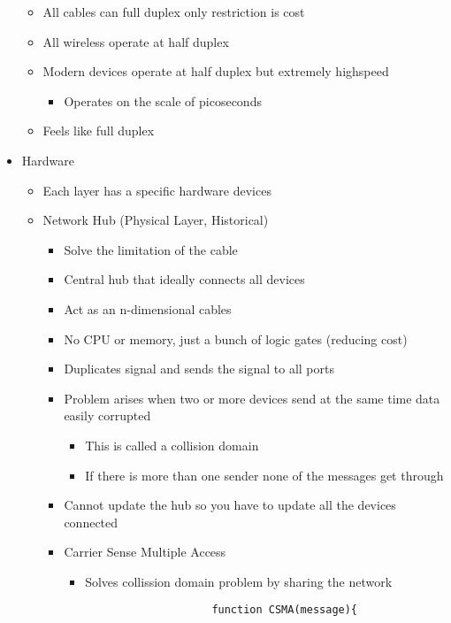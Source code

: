 \documentclass{article}
\begin{document}
\begin{itemize}
\begin{itemize}
\begin{itemize}
        \end{itemize}
        \item All cables can full duplex only restriction is cost
        \item All wireless operate at half duplex
        \item Modern devices operate at half duplex but extremely highspeed
        \begin{itemize}
            \item Operates on the scale of picoseconds
        \end{itemize}
        \item Feels like full duplex 
    \end{itemize}
    \item Hardware
    \begin{itemize}
        \item Each layer has a specific hardware devices
        \item Network Hub (Physical Layer, Historical)
        \begin{itemize}
            \item Solve the limitation of the cable
            \item Central hub that ideally connects all devices
            \item Act as an n-dimensional cables
            \item No CPU or memory, just a bunch of logic gates (reducing cost)
            \item Duplicates signal and sends the signal to all ports
            \item Problem arises when two or more devices send at the same time data easily corrupted
            \begin{itemize}
                \item This is called a collision domain
                \item If there is more than one sender none of the messages get through
            \end{itemize}
            \item Cannot update the hub so you have to update all the devices connected
            \item Carrier Sense Multiple Access
            \begin{itemize}
                \item Solves collission domain problem by sharing the network
                \begin{lstlisting}
                    function CSMA(message){

\end{lstlisting}
\end{itemize}
\end{itemize}
\end{itemize}
\end{itemize}
\end{document}

